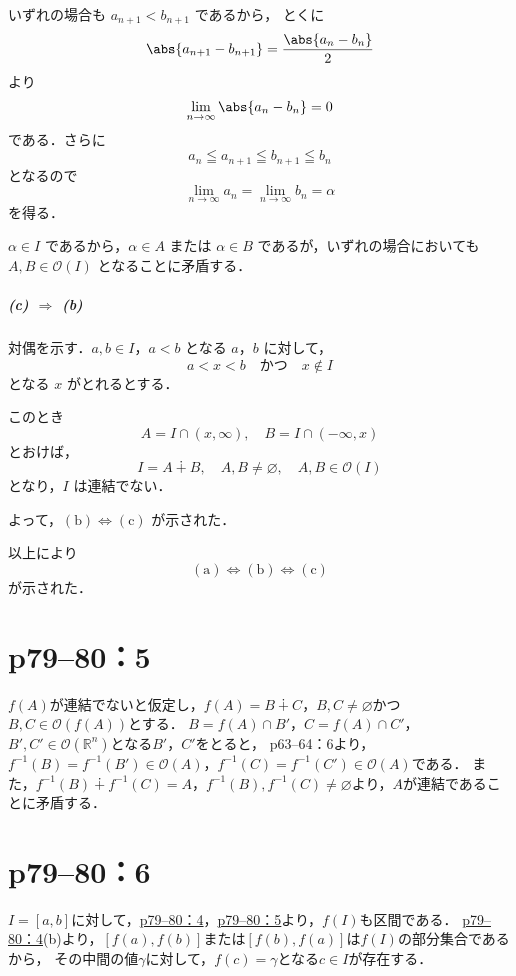 \begin{tproof}
    いずれの場合も $a_{n+1}< b_{n+1}$ であるから，
    とくに
    \[
        \abs{a_{n+1} - b_{n+1}} = \frac{\abs{a_n - b_n}}{2}
    \]
    より
    \[
        \lim_{n \to \infty} \abs{a_n - b_n} = 0
    \]
    である．さらに
    \[
        a_n \leqq a_{n+1} \leqq b_{n+1} \leqq b_n
    \]
    となるので
    \[
        \lim_{n \to \infty} a_n = \lim_{n \to \infty} b_n = \alpha
    \]
    を得る．

    $\alpha \in I$ であるから，$\alpha \in A$ または $\alpha \in B$ であるが，いずれの場合においても
    $A , B \in \mathcal{O} (I)$ となることに矛盾する．

    \subparagraph{(c) $\Longrightarrow$ (b)}
    対偶を示す．$a,b \in I$，$a < b$ となる $a$，$b$ に対して，
    \[
        a < x < b \quad \text{かつ}\quad x \notin I
    \]
    となる $x$ がとれるとする．

    このとき
    \[
        A = I \cap (x,\infty), \quad B = I \cap (-\infty,x)
    \]
    とおけば，
    \[
        I = A \dotplus B,\quad A , B \ne \varnothing,\quad A , B \in \mathcal{O} (I)
    \]
    となり，$I$ は連結でない．

    よって，$(\text{b}) \iff (\text{c})$ が示された．
    \bigskip

    以上により
    \[
        (\text{a}) \iff (\text{b}) \iff (\text{c})
    \]
    が示された．
\end{tproof}


\section*{p79--80：5} \label{p79--80：5}
\begin{tproof}
    $f(A)$が連結でないと仮定し，$f(A) = B \dotplus C$，$B,C \ne \varnothing$かつ$B,C \in \mathcal{O} (f(A))$とする．
    $B = f(A) \cap B '$，$C = f(A) \cap C '$，$B ', C ' \in \mathcal{O} (\mathbb{R}^n)$となる$B'$，$C'$をとると，
    p63--64：6より，$f^{-1} (B) = f^{-1}(B') \in \mathcal{O}(A)$，$f^{-1} (C) = f^{-1}(C') \in \mathcal{O}(A)$である．
    また，$f^{-1}(B) \dotplus f^{-1}(C) =A$，$ f^{-1}(B), f^{-1}(C) \ne \varnothing$より，$A$が連結であることに矛盾する．
\end{tproof}


\section*{p79--80：6}
\begin{tproof}
    $I = [a,b]$に対して，\hyperref[p79--80：4]{p79--80：4}，\hyperref[p79--80：5]{p79--80：5}より，$f(I)$も区間である．
    \hyperref[p79--80：4]{p79--80：4}(b)より，$[f(a),f(b)]$または$[f(b),f(a)]$は$f(I)$の部分集合であるから，
    その中間の値$\gamma$に対して，$f(c)=\gamma$となる$c \in I$が存在する．
\end{tproof}


